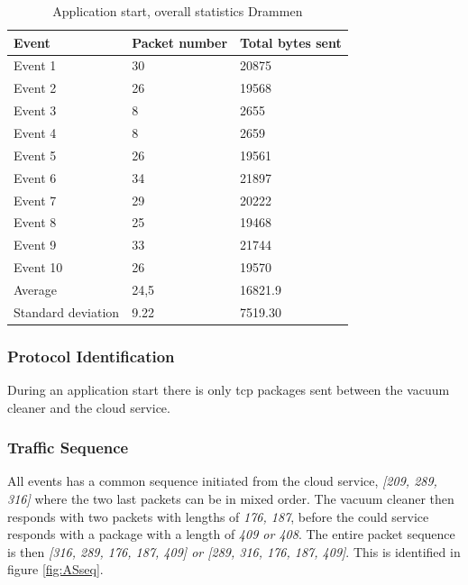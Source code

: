 \begin{table}[H]
\centering
\caption{Application start, overall statistics Drammen}
\label{tab:ASoverallDRA}
\begin{tabular}{|l|l|l|}
\hline
\textbf{Event} & \textbf{Packet number} & \textbf{Total bytes sent} \\ \hline
Event 1        & 30                     & 20875                     \\ \hline
Event 2        & 26                     & 19568                     \\ \hline
Event 3        & 8                      & 2655                      \\ \hline
Event 4        & 8                      & 2659                      \\ \hline
Event 5        & 26                     & 19561                     \\ \hline
Event 6        & 34                     & 21897                     \\ \hline
Event 7        & 29                     & 20222                     \\ \hline
Event 8        & 25                     & 19468                     \\ \hline
Event 9        & 33                     & 21744                     \\ \hline
Event 10       & 26                     & 19570                     \\ \hline
Average        & 24,5                   & 16821.9                   \\ \hline
Standard deviation        & 9.22
       & 7519.30               \\ \hline
\end{tabular}
\end{table}

\subsubsection{Protocol Identification}
During an application start there is only tcp packages sent between the vacuum cleaner and the cloud service.

\subsubsection{Traffic Sequence}
All events has a common sequence initiated from the cloud service, \textit{[209, 289, 316]} where the two last packets can be in mixed order. The vacuum cleaner then responds with two packets with lengths of \textit{176, 187}, before the could service responds with a package with a length of \textit{409 or 408}. The entire packet sequence is then \textit{[316, 289, 176, 187, 409] or [289, 316, 176, 187, 409]}. This is identified in figure \ref{fig:ASseq}.

